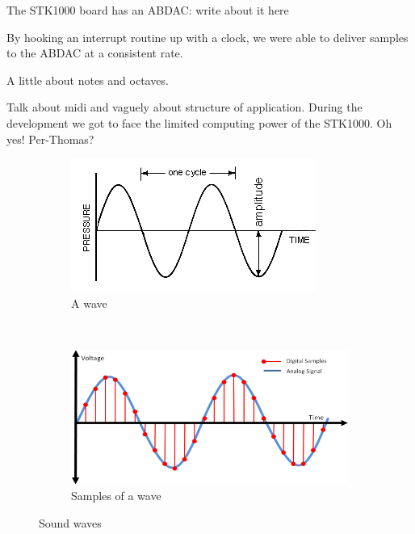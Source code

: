 \documentclass[a4paper,12pt]{article}
\begin{document}
The STK1000 board has an ABDAC: write about it here \thiswillgivelatexerror

By hooking an interrupt routine up with a clock, we were able to deliver samples to the ABDAC at a consistent rate.

A little about notes and octaves.

Talk about midi and vaguely about structure of application.
During the development we got to face the limited computing power of the STK1000.
Oh yes! Per-Thomas?


\begin{figure}[b]
        \centering
        \begin{subfigure}[b]{0.57\textwidth}
                \centering
                \includegraphics[width=\textwidth]{sinwave}
                \caption{A wave}
                \label{sinwave}
        \end{subfigure}%
        ~ 
        \begin{subfigure}[b]{0.52\textwidth}
                \centering
                \includegraphics[width=\textwidth]{digwave}
                \caption{Samples of a wave}
                \label{digwave}
        \end{subfigure}
    \caption{Sound waves}
   \label{waves}
\end{figure}
\end{document}

